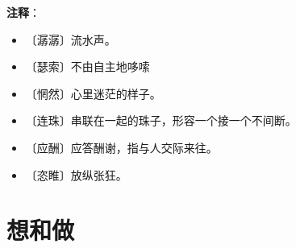 \documentclass[12pt,UTF-8,openany]{ctexbook}
\begin{document}
\newpage

\textbf{注释}：

\vspace{-1em}

\begin{itemize}
    \setlength\itemsep{-0.2em}
    \item 〔潺潺〕流水声。
    \item 〔瑟索〕不由自主地哆嗦
    \item 〔惘然〕心里迷茫的样子。
    \item 〔连珠〕串联在一起的珠子，形容一个接一个不间断。
    \item 〔应酬〕应答酬谢，指与人交际来往。
    \item 〔恣睢〕放纵张狂。
\end{itemize}

\chapter{想和做}
\end{document}
